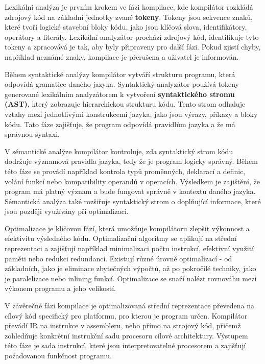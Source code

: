 Lexikální analýza je prvním krokem ve fázi kompilace, kde kompilátor rozkládá zdrojový kód na základní jednotky zvané {\bf tokeny}. Tokeny jsou sekvence znaků, které tvoří logické stavební bloky kódu, jako jsou klíčová slova, identifikátory, operátory a literály. Lexikální analyzátor prochází zdrojový kód, identifikuje tyto tokeny a zpracovává je tak, aby byly připraveny pro další fázi. Pokud zjistí chyby, například neznámé znaky, kompilace je přerušena a uživatel je informován.


Během syntaktické analýzy kompilátor vytváří strukturu programu, která odpovídá gramatice daného jazyka. Syntaktický analyzátor používá tokeny generované lexikálním analyzátorem k vytvoření {\bf syntaktického stromu (AST)}, který zobrazuje hierarchickou strukturu kódu. Tento strom odhaluje vztahy mezi jednotlivými konstrukcemi jazyka, jako jsou výrazy, příkazy a bloky kódu. Tato fáze zajišťuje, že program odpovídá pravidlům jazyka a že má správnou syntaxi.

V sémantické analýze kompilátor kontroluje, zda syntaktický strom kódu dodržuje významová pravidla jazyka, tedy že je program logicky správný. Během této fáze se provádí například kontrola typů proměnných, deklarací a definic, volání funkcí nebo kompatibility operandů v operacích. Výsledkem je zajištění, že program má platný význam a bude fungovat správně v kontextu daného jazyka. Sémantická analýza také rozšiřuje syntaktický strom o doplňující informace, které jsou později využívány při optimalizaci.

Optimalizace je klíčovou fází, která umožňuje kompilátoru zlepšit výkonnost a efektivitu výsledného kódu. Optimalizační algoritmy se aplikují na střední reprezentaci a zajišťují například minimalizaci počtu instrukcí, efektivní využití paměti nebo redukci redundancí. Existují různé úrovně optimalizací - od základních, jako je eliminace zbytečných výpočtů, až po pokročilé techniky, jako je paralelizace nebo inlining funkcí. Optimalizace se snaží nalézt rovnováhu mezi výkonem programu a jeho velikostí.

V závěrečné fázi kompilace je optimalizovaná střední reprezentace převedena na cílový kód specifický pro platformu, pro kterou je program určen. Kompilátor převádí IR na instrukce v assembleru, nebo přímo na strojový kód, přičemž zohledňuje konkrétní instrukční sadu procesoru cílové architektury. Výstupem této fáze je sada instrukcí, které jsou interpretovatelné procesorem a zajišťují požadovanou funkčnost programu.




